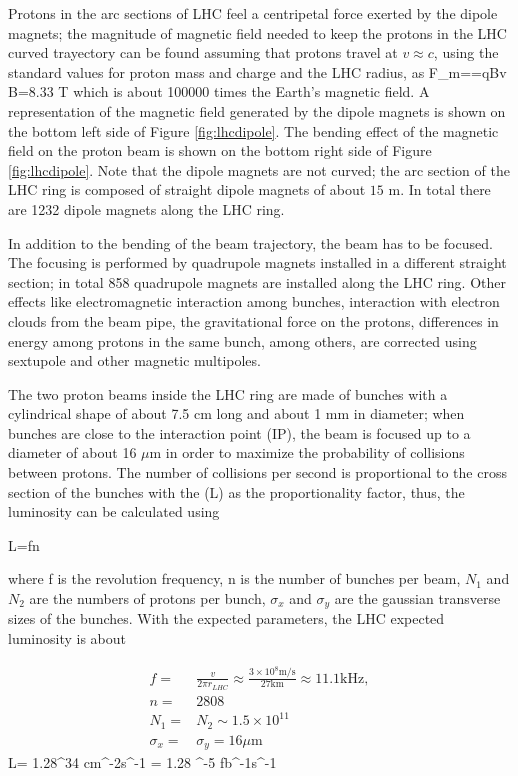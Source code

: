 Protons in the arc sections of LHC feel a centripetal force exerted by the dipole magnets; the magnitude of magnetic field needed to keep the protons in the LHC curved trayectory can be found assuming that protons travel at $v \approx c$, using the standard values for proton mass and charge and the LHC radius, as
\beqn
F_m==qBv \quad \to B=8.33 T
\eeqn
\noindent which is about 100000 times the Earth's magnetic field. A representation of the magnetic field generated by the dipole magnets is shown on the bottom left side of Figure \ref{fig:lhcdipole}. The bending effect of the magnetic field on the proton beam is shown on the bottom right side of Figure \ref{fig:lhcdipole}. Note that the dipole magnets are not curved; the arc section of the LHC ring is composed of straight dipole magnets of about ${15 \textrm{ m}}$. In total there are 1232 dipole magnets along the LHC ring.

In addition to the bending of the beam trajectory, the beam has to be focused. The focusing is performed by quadrupole magnets installed in a different straight section; in total 858 quadrupole magnets are installed along the LHC ring. Other effects like electromagnetic interaction among bunches, interaction with electron clouds from the beam pipe, the gravitational force on the protons, differences in energy among protons in the same bunch, among others, are corrected using sextupole and other magnetic multipoles.

The two proton beams inside the LHC ring are made of bunches with a cylindrical shape of about 7.5 cm long and about 1 mm in diameter; when bunches are close to the interaction point (IP), the beam is focused up to a diameter of about 16 $\mu$m in order to maximize the probability of collisions between protons. The number of collisions per second is proportional to the cross section of the bunches with the  (L) as the proportionality factor, thus, the luminosity can be calculated using

\beqn
L=fn\label{eq:lumi}
\eeqn

\noindent where f is the revolution frequency, n is the number of bunches per beam, $N_1$ and $N_2$ are the numbers of protons per bunch, $\sigma_x$ and $\sigma_y$ are the gaussian transverse sizes of the bunches. With the expected parameters, the LHC expected luminosity is about  

\begin{align}
  f=&\frac{v}{2\pi r_{LHC}}\approx\frac{3\times10^8\textrm{m/s}}{27\textrm{km}}\approx 11.1 \textrm{kHz},\nonumber \\
  n=&2808\nonumber \\ 
  N_1=&N_2 \sim1.5\times 10^{11}\nonumber\\
  \sigma_x=&\sigma_y=16\mu \textrm{m}\nonumber
\end{align}
\beqn
L= 1.28^{34} \textrm{cm}^{-2}\textrm{s}^{-1} = 1.28 ^{-5} \textrm{fb}^{-1}\textrm{s}^{-1}
\eeqn

